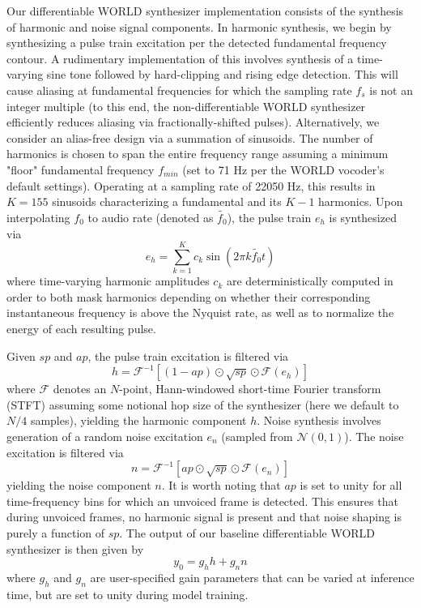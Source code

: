 \documentclass{article}
\begin{document}
\begin{sloppy}
Our differentiable WORLD synthesizer implementation consists of the synthesis of harmonic and noise signal components.  In harmonic synthesis, we begin by synthesizing a pulse train excitation per the detected fundamental frequency contour.  A rudimentary implementation of this involves synthesis of a time-varying sine tone followed by hard-clipping and rising edge detection.  This will cause aliasing at fundamental frequencies for which the sampling rate $f_s$ is not an integer multiple (to this end, the non-differentiable WORLD synthesizer efficiently reduces aliasing via fractionally-shifted pulses).  Alternatively, we consider an alias-free design via a summation of sinusoids.  The number of harmonics is chosen to span the entire frequency range assuming a minimum "floor" fundamental frequency $f_{min}$ (set to 71 Hz per the WORLD vocoder's default settings).  Operating at a sampling rate of 22050 Hz, this results in $K=155$ sinusoids characterizing a fundamental and its $K-1$ harmonics.  Upon interpolating $f_0$ to audio rate (denoted as $\tilde{f_0}$), the pulse train $e_h$ is synthesized via
\begin{equation}
\label{eqn:pulse}
e_h = \sum_{k=1}^Kc_k\sin(2\pi k\tilde{f_0}t)
\end{equation}
where time-varying harmonic amplitudes $c_k$ are deterministically computed in order to both mask harmonics depending on whether their corresponding instantaneous frequency is above the Nyquist rate, as well as to normalize the energy of each resulting pulse.

Given $sp$ and $ap$, the pulse train excitation is filtered via
\begin{equation}
\label{eqn:harm}
h = \mathcal{F}^{-1}\left[(1-ap)\odot\sqrt{sp}\odot\mathcal{F}(e_h)\right]
\end{equation}
where $\mathcal{F}$ denotes an $N$-point, Hann-windowed short-time Fourier transform (STFT) assuming some notional hop size of the synthesizer (here we default to $N/4$ samples), yielding the harmonic component $h$.  Noise synthesis involves generation of a random noise excitation $e_n$ (sampled from $\mathcal{N}(0, 1)$).  The noise excitation is filtered via
\begin{equation}
\label{eqn:nz}
n = \mathcal{F}^{-1}\left[ap\odot\sqrt{sp}\odot\mathcal{F}(e_n)\right]
\end{equation}
yielding the noise component $n$.  It is worth noting that $ap$ is set to unity for all time-frequency bins for which an unvoiced frame is detected.  This ensures that during unvoiced frames, no harmonic signal is present and that noise shaping is purely a function of $sp$.  The output of our baseline differentiable WORLD synthesizer is then given by
\begin{equation}
\label{eqn:baseline}
y_0 = g_hh+g_nn
\end{equation}
where $g_h$ and $g_n$ are user-specified gain parameters that can be varied at inference time, but are set to unity during model training.

\end{sloppy}
\end{document}
